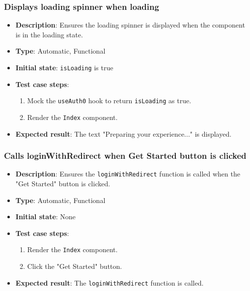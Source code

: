 \documentclass[12pt, titlepage]{article}
\begin{document}
\subsubsection{Displays loading spinner when loading}
\begin{itemize}
    \item \textbf{Description}: Ensures the loading spinner is displayed when the component is in the loading state.
    \item \textbf{Type}: Automatic, Functional
    \item \textbf{Initial state}: \texttt{isLoading} is true
    \item \textbf{Test case steps}:
    \begin{enumerate}
        \item Mock the \texttt{useAuth0} hook to return \texttt{isLoading} as true.
        \item Render the \texttt{Index} component.
    \end{enumerate}
    \item \textbf{Expected result}: The text "Preparing your experience..." is displayed.
\end{itemize}

\subsubsection{Calls loginWithRedirect when Get Started button is clicked}
\begin{itemize}
    \item \textbf{Description}: Ensures the \texttt{loginWithRedirect} function is called when the "Get Started" button is clicked.
    \item \textbf{Type}: Automatic, Functional
    \item \textbf{Initial state}: None
    \item \textbf{Test case steps}:
    \begin{enumerate}
        \item Render the \texttt{Index} component.
        \item Click the "Get Started" button.
    \end{enumerate}
    \item \textbf{Expected result}: The \texttt{loginWithRedirect} function is called.
\end{itemize}
\end{document}
